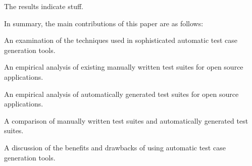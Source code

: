 The results indicate stuff.

In summary, the main contributions of this paper are as follows:
\squishlist 
\item An examination of the techniques used in sophisticated automatic test case generation tools.
\item An empirical analysis of existing manually written test suites for open source applications.
\item An empirical analysis of automatically generated test suites for open source applications.
\item A comparison of manually written test suites and automatically generated test suites.
\item A discussion of the benefits and drawbacks of using automatic test case generation tools.
\squishend 

